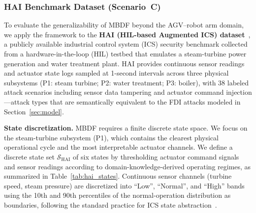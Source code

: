 \documentclass[manuscript,screen,review]{acmart}
\begin{document}
\subsubsection{HAI Benchmark Dataset (Scenario~C)}
\label{sec:hai_setup}

To evaluate the generalizability of MBDF beyond the
AGV--robot arm domain, we apply the framework to the
\textbf{HAI (HIL-based Augmented ICS) dataset}~\cite{ref_hai},
a publicly available industrial control system (ICS)
security benchmark collected from a hardware-in-the-loop
(HIL) testbed that emulates a steam-turbine power generation
and water treatment plant. HAI provides continuous sensor
readings and actuator state logs sampled at 1-second
intervals across three physical subsystems
(P1: steam turbine; P2: water treatment; P3: boiler),
with 38 labeled attack scenarios including sensor data
tampering and actuator command injection---attack types
that are semantically equivalent to the FDI attacks
modeled in Section~\ref{sec:model}.

\textbf{State discretization.}
MBDF requires a finite discrete state space. We focus on
the steam-turbine subsystem (P1), which contains the
clearest physical operational cycle and the most
interpretable actuator channels. We define a discrete
state set $\mathcal{S}_{\mathrm{HAI}}$ of six states
by thresholding actuator command signals and sensor
readings according to domain-knowledge-derived operating
regimes, as summarized in Table~\ref{tab:hai_states}.
Continuous sensor channels (turbine speed, steam pressure)
are discretized into ``Low'', ``Normal'', and ``High''
bands using the 10th and 90th percentiles of the
normal-operation distribution as boundaries, following
the standard practice for ICS state abstraction~\cite{ref16}.
\end{document}
